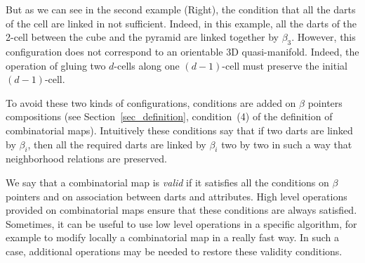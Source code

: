 But as we can see in the second example (Right), the condition that
all the darts of the cell are linked in not sufficient. Indeed, in
this example, all the darts of the 2-cell between the cube and the
pyramid are linked together by $\beta_3$. However, this configuration
does not correspond to an orientable 3D quasi-manifold. Indeed, the
operation of gluing two $d$-cells along one $(d-1)$-cell must
preserve the initial $(d-1)$-cell.

To avoid these two kinds of configurations, conditions are added on
$\beta$ pointers compositions (see Section~\ref{sec_definition},
condition~(4) of the definition of combinatorial maps). Intuitively
these conditions say that if two darts are linked by $\beta_i$, then
all the required darts are linked by $\beta_i$ two by two in such a
way that neighborhood relations are preserved.


We say that a combinatorial map is \emph{valid} if it satisfies all
the conditions on $\beta$ pointers and on association between darts
and attributes.  High level operations provided on combinatorial maps
ensure that these conditions are always satisfied. Sometimes, it can
be useful to use low level operations in a specific algorithm, for
example to modify locally a combinatorial map in a really fast way. In
such a case, additional operations may be needed to restore these
validity conditions.

%







